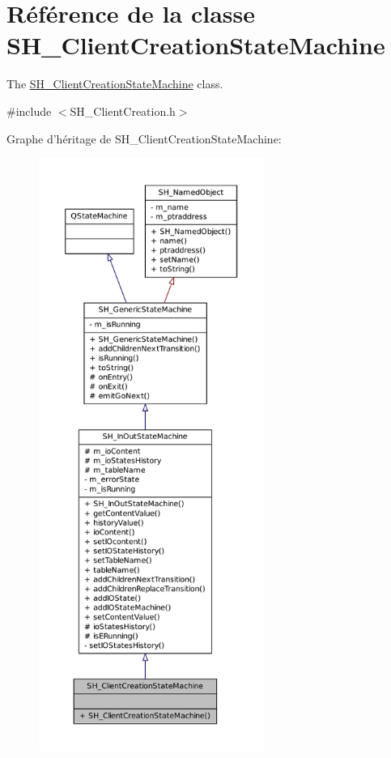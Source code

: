 \hypertarget{classSH__ClientCreationStateMachine}{\section{Référence de la classe S\-H\-\_\-\-Client\-Creation\-State\-Machine}
\label{classSH__ClientCreationStateMachine}
}


The \hyperlink{classSH__ClientCreationStateMachine}{S\-H\-\_\-\-Client\-Creation\-State\-Machine} class.  




{\ttfamily \#include $<$S\-H\-\_\-\-Client\-Creation.\-h$>$}



Graphe d'héritage de S\-H\-\_\-\-Client\-Creation\-State\-Machine\-:
\nopagebreak
\begin{figure}[H]
\begin{center}
\leavevmode
\includegraphics[height=550pt]{classSH__ClientCreationStateMachine__inherit__graph}
\end{center}
\end{figure}


